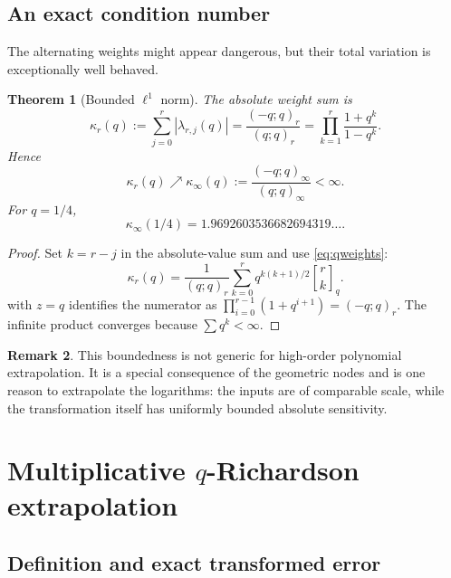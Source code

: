 \documentclass[11pt]{article}
\newtheorem{theorem}{Theorem}[section]
\theoremstyle{definition}
\newtheorem{remark}[theorem]{Remark}
\theoremstyle{remark}
\newcommand{\qbinom}[3]{\genfrac{[}{]}{0pt}{}{#1}{#2}_{#3}}
\begin{document}
\subsection{An exact condition number}

The alternating weights might appear dangerous, but their total variation is exceptionally well behaved.

\begin{theorem}[Bounded $\ell^1$ norm]
\label{thm:qcondition}
The absolute weight sum is
\begin{equation}
\kappa_r(q):=\sum_{j=0}^{r}|\lambda_{r,j}(q)|
=\frac{(-q;q)_r}{(q;q)_r}
=\prod_{k=1}^{r}\frac{1+q^k}{1-q^k}.
\label{eq:qcondition}
\end{equation}
Hence
\begin{equation}
\kappa_r(q)\nearrow \kappa_\infty(q)
:=\frac{(-q;q)_\infty}{(q;q)_\infty}<\infty.
\label{eq:qcondition-limit}
\end{equation}
For $q=1/4$,
\begin{equation}
\kappa_\infty(1/4)=1.9692603536682694319\ldots.
\label{eq:qcondition-dyadic}
\end{equation}
\end{theorem}

\begin{proof}
Set $k=r-j$ in the absolute-value sum and use \cref{eq:qweights}:
\[
\kappa_r(q)=\frac1{(q;q)_r}
\sum_{k=0}^{r}q^{k(k+1)/2}\qbinom{r}{k}{q}.
\]
 with $z=q$ identifies the numerator as
$\prod_{i=0}^{r-1}(1+q^{i+1})=(-q;q)_r$. The infinite product converges because $\sum q^k<\infty$.
\end{proof}

\begin{remark}
This boundedness is not generic for high-order polynomial extrapolation. It is a special consequence of the geometric nodes and is one reason to extrapolate the logarithms: the inputs are of comparable scale, while the transformation itself has uniformly bounded absolute sensitivity.
\end{remark}

\section{Multiplicative \texorpdfstring{$q$}{q}-Richardson extrapolation}
\label{sec:qrichardson}

\subsection{Definition and exact transformed error}
\end{document}
